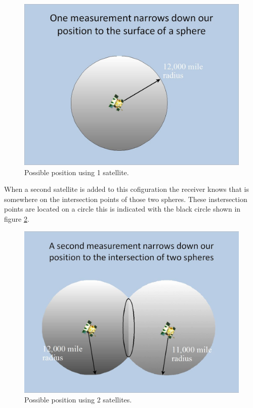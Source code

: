\documentclass{article}
\begin{document}
\begin{figure}[H]
	\centering
	\includegraphics[scale=0.25]{figures/1msmt}
	\caption{Possible position using 1 satellite. }
	\label{sat1}
\end{figure}

When a second satellite is added to this cofiguration the receiver knows that is somewhere on the intersection points of those two spheres. These instersection points are located on a circle this is indicated with the black circle shown in figure \ref{sat2}.

\begin{figure}[H]
	\centering
	\includegraphics[scale=0.25]{figures/2msmts}
	\caption{Possible position using 2 satellites. }
	\label{sat2}
\end{figure}
\end{document}
